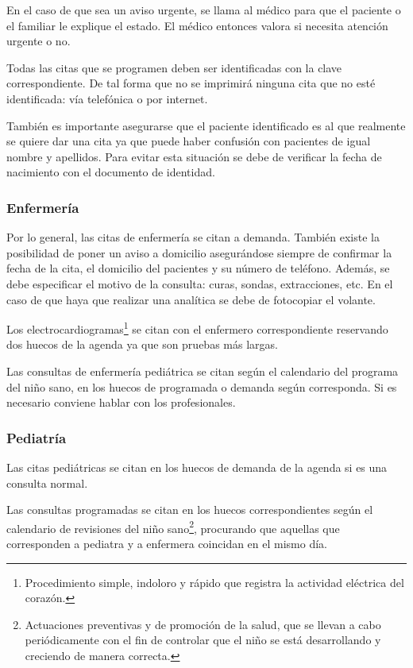 En el caso de que sea un aviso urgente, se llama al médico para que el paciente o el familiar le explique el estado.
El médico entonces valora si necesita atención urgente o no.

Todas las citas que se programen deben ser identificadas con la clave correspondiente.
De tal forma que no se imprimirá ninguna cita que no esté identificada: vía telefónica o por internet.

También es importante asegurarse que el paciente identificado es al que realmente se quiere dar una cita ya que puede haber confusión con pacientes de igual nombre y apellidos.
Para evitar esta situación se debe de verificar la fecha de nacimiento con el documento de identidad.

\subsubsection{Enfermería}

Por lo general, las citas de enfermería se citan a demanda.
También existe la posibilidad de poner un aviso a domicilio asegurándose siempre de confirmar la fecha de la cita, el domicilio del pacientes y su número de teléfono.
Además, se debe especificar el motivo de la consulta: curas, sondas, extracciones, etc.
En el caso de que haya que realizar una analítica se debe de fotocopiar el volante.

Los electrocardiogramas\footnote{Procedimiento simple, indoloro y rápido que registra la actividad eléctrica del corazón.} se citan con el enfermero correspondiente reservando dos huecos de la agenda ya que son pruebas más largas.

Las consultas de enfermería pediátrica se citan según el calendario del programa del niño sano, en los huecos de programada o demanda según corresponda. Si es necesario conviene hablar con los profesionales.

\subsubsection{Pediatría}

Las citas pediátricas se citan en los huecos de demanda de la agenda si es una consulta normal.

Las consultas programadas se citan en los huecos correspondientes según el calendario de revisiones del niño sano\footnote{Actuaciones preventivas y de promoción de la salud, que se llevan a cabo periódicamente con el fin de controlar que el niño se está desarrollando y creciendo de manera correcta.}, procurando que aquellas que corresponden a pediatra y a enfermera coincidan en el mismo día.

